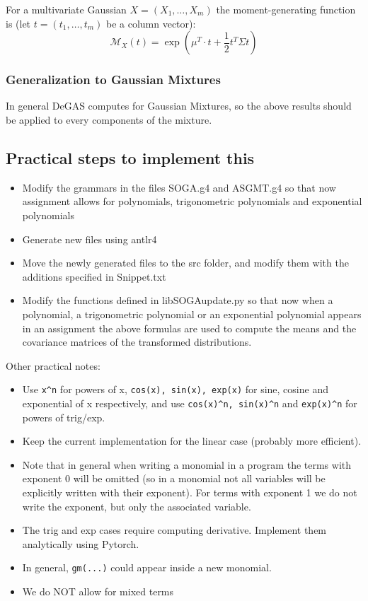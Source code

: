 \documentclass{article}
\begin{document}
For a multivariate Gaussian $X = (X_1, \hdots, X_m)$ the moment-generating function is (let $t = (t_1, \hdots, t_m)$ be a column vector):
$$\mathcal{M}_X(t) = \exp\left(\mu^T \cdot t + \frac{1}{2} t^T \Sigma t\right)$$

\subsubsection{Generalization to Gaussian Mixtures}

In general DeGAS computes for Gaussian Mixtures, so the above results should be applied to every components of the mixture.

\subsection{Practical steps to implement this}

\begin{itemize}
    \item Modify the grammars in the files SOGA.g4 and ASGMT.g4 so that now assignment allows for polynomials, trigonometric polynomials and exponential polynomials
    \item Generate new files using antlr4
    \item Move the newly generated files to the src folder, and modify them with the additions specified in Snippet.txt 
    \item Modify the functions defined in libSOGAupdate.py so that now when a polynomial, a trigonometric polynomial or an exponential polynomial appears in an assignment the above formulas are used to compute the means and the covariance matrices of the transformed distributions.
\end{itemize}

Other practical notes:
\begin{itemize}
\item Use \texttt{x\textasciicircum n} for powers of x, \texttt{cos(x), sin(x), exp(x)} for sine, cosine and exponential of x respectively, and use \texttt{cos(x)\textasciicircum n, sin(x)\textasciicircum n} and \texttt{exp(x)\textasciicircum n} for powers of trig/exp.
\item Keep the current implementation for the linear case (probably more efficient). 
\item Note that in general when writing a monomial in a program the terms with exponent 0 will be omitted (so in a monomial not all variables will be explicitly written with their exponent). For terms with exponent 1 we do not write the exponent, but only the associated variable.
\item The trig and exp cases require computing derivative. Implement them analytically using Pytorch.
\item In general, \texttt{gm(...)} could appear inside a new monomial. 
\item We do NOT allow for mixed terms
\end{itemize}
\end{document}

